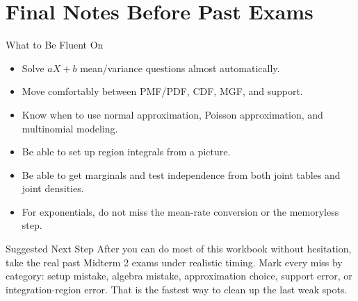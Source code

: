 \documentclass[12pt]{article}
\begin{document}
\clearpage

\section*{Final Notes Before Past Exams}

\begin{reviewbox}{What to Be Fluent On}
\begin{itemize}
  \item Solve $aX+b$ mean/variance questions almost automatically.
  \item Move comfortably between PMF/PDF, CDF, MGF, and support.
  \item Know when to use normal approximation, Poisson approximation, and multinomial modeling.
  \item Be able to set up region integrals from a picture.
  \item Be able to get marginals and test independence from both joint tables and joint densities.
  \item For exponentials, do not miss the mean-rate conversion or the memoryless step.
\end{itemize}
\end{reviewbox}

\begin{patternbox}{Suggested Next Step}
After you can do most of this workbook without hesitation, take the real past Midterm 2 exams under realistic timing. Mark every miss by category: setup mistake, algebra mistake, approximation choice, support error, or integration-region error. That is the fastest way to clean up the last weak spots.
\end{patternbox}
\end{document}
